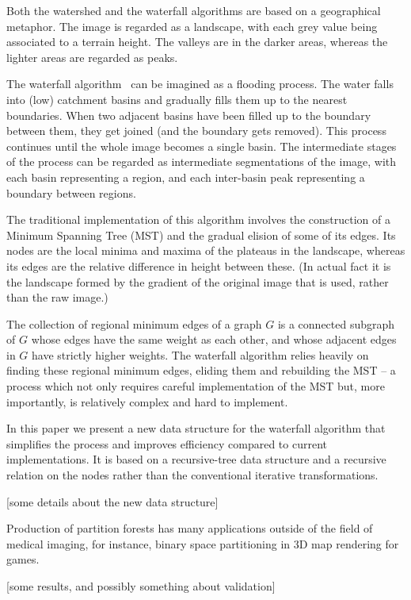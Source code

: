 \documentclass{ouclprgsc}
\begin{document}
Both the watershed and the waterfall algorithms are based on a
geographical metaphor. The image is regarded as a landscape, with each
grey value being associated to a terrain height. The valleys are in
the darker areas, whereas the lighter areas are regarded as peaks.

The waterfall algorithm~\cite{beucher,marcotegui} can be imagined as a flooding
process. The water falls into (low) catchment basins and gradually
fills them up to the nearest boundaries. When two adjacent basins have
been filled up to the boundary between them, they get joined (and the
boundary gets removed). This process continues until the whole image
becomes a single basin. The intermediate stages of the process can be
regarded as intermediate segmentations of the image, with each basin
representing a region, and each inter-basin peak representing a
boundary between regions.

The traditional implementation of this algorithm \cite{marcotegui} involves the
construction of a Minimum Spanning Tree (MST) and the gradual elision
of some of its edges. Its nodes are the local minima and maxima of the
plateaus in the landscape, whereas its edges are the relative
difference in height between these. (In actual fact it is the
landscape formed by the gradient of the original image that is used,
rather than the raw image.)

The collection of regional minimum edges of a graph $G$ is a connected
subgraph of $G$ whose edges have the same weight as each other, and
whose adjacent edges in $G$ have strictly higher weights. The
waterfall algorithm relies heavily on finding these regional minimum
edges, eliding them and rebuilding the MST -- a process which not only
requires careful implementation of the MST but, more importantly, is
relatively complex and hard to implement.

In this paper we present a new data structure for the waterfall
algorithm that simplifies the process and improves efficiency compared
to current implementations. It is based on a recursive-tree data
structure and a recursive relation on the nodes rather than the
conventional iterative transformations.

[some details about the new data structure]

Production of partition forests has many applications outside of the
field of medical imaging, for instance, binary space partitioning in
3D map rendering for games.

[some results, and possibly something about validation]

\begin{thebibliography}{2}



\end{thebibliography}
\end{document}
